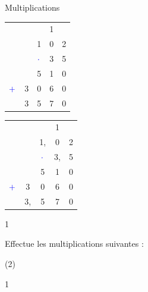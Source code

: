 \documentclass[a4paper,11pt]{report}
\begin{document}
\begin{resolu}{Multiplications}
{\begin{minipage}{0,45\linewidth}
{{{\color{blue}
\begin{tabular}{ccccc}
& & &{\color{red}\footnotesize{1}}  & \\
& & 1 & 0 &2 \\
& & ${\color{blue}\cdot}$ & 3 & 5 \\\hline
& & 5 & 1 & 0 \\
${\color{blue}+}$ & 3 & 0 & 6 & 0 \\\hline
& 3 & 5 & 7 & 0 \\
\end{tabular}
}}}
\end{minipage}\hfill
\begin{minipage}{0,45\linewidth}
{{{\color{blue}
\begin{tabular}{ccccc}
& & &{\color{red}\footnotesize{1}}  & \\
& & 1, & 0 &2 \\
& & ${\color{blue}\cdot}$ & 3, & 5 \\\hline
& & 5 & 1 & 0 \\
${\color{blue}+}$ & 3 & 0 & 6 & 0 \\\hline
& 3, & 5 & 7 & 0 \\
\end{tabular}
}}}
\end{minipage}


}{1}
\end{resolu}

\begin{exop}{
Effectue les multiplications suivantes : 
\bigskip
\begin{tasks}(2)
\end{tasks}
\vspace*{1cm}
}{1}
\end{exop}
\end{document}
